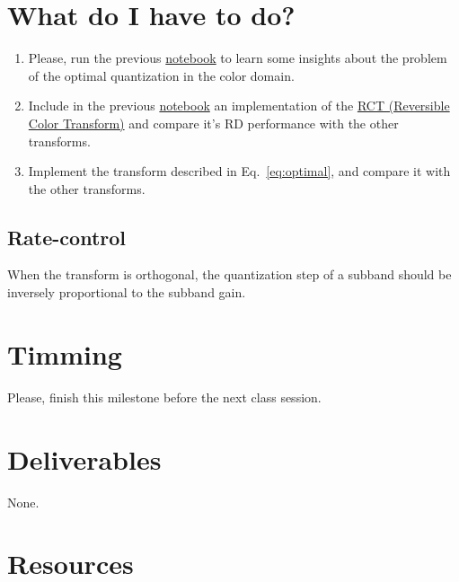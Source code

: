 \section{What do I have to do?}

\begin{enumerate}
\item Please, run the previous
  \href{https://github.com/Sistemas-Multimedia/Sistemas-Multimedia.github.io/blob/master/study_guide/06-color_transform/performance.ipynb}{notebook}
  to learn some insights about the problem of the optimal
  quantization in the color domain.
\item Include in the previous
  \href{https://github.com/Sistemas-Multimedia/Sistemas-Multimedia.github.io/blob/master/study_guide/06-color_transform/performance.ipynb}{notebook}
  an implementation of the
  \href{https://en.wikipedia.org/wiki/JPEG_2000#Color_components_transformation}{RCT
    (Reversible Color Transform)} and compare it's RD performance with
  the other transforms.
\item Implement the transform described in Eq.~\ref{eq:optimal}, and
  compare it with the other transforms.
\end{enumerate}

\subsection{Rate-control}
When the transform is orthogonal, the quantization step of a subband should be inversely proportional to the subband gain.  

\section{Timming}

Please, finish this milestone before the next class session.

\section{Deliverables}

None.

\section{Resources}

\renewcommand{\addcontentsline}[3]{}%

